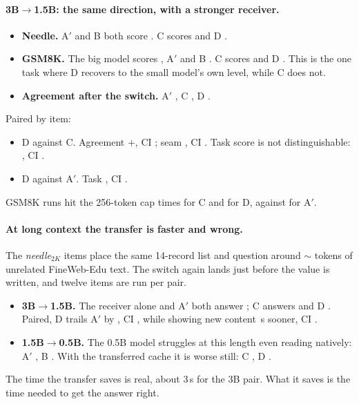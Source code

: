 \paragraph{3B$\to$1.5B: the same direction, with a stronger receiver.}
\begin{itemize}
\item \textbf{Needle.} A$'$ and B both score . C scores  and D .
\item \textbf{GSM8K.} The big model scores , A$'$  and B . C scores  and D . This is the one task where D recovers to the small model's own level, while C does not.
\item \textbf{Agreement after the switch.} A$'$ , C , D .
\end{itemize}
Paired by item:
\begin{itemize}
\item D against C. Agreement $+$, CI ; seam , CI . Task score is not distinguishable: , CI .
\item D against A$'$. Task , CI .
\end{itemize}
GSM8K runs hit the 256-token cap  times for C and  for D, against  for A$'$.

\paragraph{At long context the transfer is faster and wrong.}
The \emph{needle$_{2K}$} items place the same 14-record list and question around $\sim$ tokens of unrelated FineWeb-Edu text.
The switch again lands just before the value is written, and twelve items are run per pair.
\begin{itemize}
\item \textbf{3B$\to$1.5B.} The receiver alone and A$'$ both answer ; C answers  and D . Paired, D trails A$'$ by , CI , while showing new content \,s sooner, CI .
\item \textbf{1.5B$\to$0.5B.} The 0.5B model struggles at this length even reading natively: A$'$ , B . With the transferred cache it is worse still: C , D .
\end{itemize}
The time the transfer saves is real, about 3\,s for the 3B pair.
What it saves is the time needed to get the answer right.
